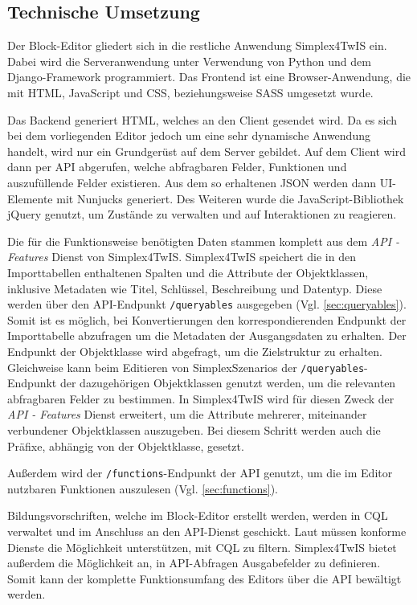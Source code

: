 \subsection{Technische Umsetzung}
Der Block-Editor gliedert sich in die restliche Anwendung Simplex4TwIS ein. Dabei wird die Serveranwendung unter Verwendung von Python und dem Django-Framework \parencite{djangosoftwarefoundationDjango} programmiert. Das Frontend ist eine Browser-Anwendung, die mit \ac{HTML}, JavaScript und \ac{CSS}, beziehungsweise \ac{SASS} umgesetzt wurde.

Das Backend generiert \ac{HTML}, welches an den Client gesendet wird. Da es sich bei dem vorliegenden Editor jedoch um eine sehr dynamische Anwendung handelt, wird nur ein Grundgerüst auf dem Server gebildet. Auf dem Client wird dann per \ac{API} abgerufen, welche abfragbaren Felder, Funktionen und auszufüllende Felder existieren. Aus dem so erhaltenen \ac{JSON} werden dann UI-Elemente mit Nunjucks \parencite{mozillaNunjucks} generiert. Des Weiteren wurde die JavaScript-Bibliothek jQuery \parencite{openjsfoundationJQuery} genutzt, um Zustände zu verwalten und auf Interaktionen zu reagieren.

Die für die Funktionsweise benötigten Daten stammen komplett aus dem \textit{API - Features} Dienst \parencite{ogcAPI} von Simplex4TwIS. Simplex4TwIS speichert die in den Importtabellen enthaltenen Spalten und die Attribute der Objektklassen, inklusive Metadaten wie Titel, Schlüssel, Beschreibung und Datentyp. Diese werden über den \ac{API}-Endpunkt \texttt{/queryables} ausgegeben (Vgl. \ref{sec:queryables}). Somit ist es möglich, bei Konvertierungen den korrespondierenden Endpunkt der Importtabelle abzufragen um die Metadaten der Ausgangsdaten zu erhalten. Der  Endpunkt der Objektklasse wird abgefragt, um die Zielstruktur zu erhalten. Gleichweise kann beim Editieren von SimplexSzenarios der \texttt{/queryables}-Endpunkt der dazugehörigen Objektklassen genutzt werden, um die relevanten abfragbaren Felder zu bestimmen. In Simplex4TwIS wird für diesen Zweck der \textit{API - Features} Dienst erweitert, um die Attribute mehrerer, miteinander verbundener Objektklassen auszugeben. Bei diesem Schritt werden auch die Präfixe, abhängig von der Objektklasse, gesetzt.

Außerdem wird der \texttt{/functions}-Endpunkt der \ac{API} genutzt, um die im Editor nutzbaren Funktionen auszulesen (Vgl. \ref{sec:functions}).

Bildungsvorschriften, welche im Block-Editor erstellt werden, werden in \ac{CQL} verwaltet und im Anschluss an den \ac{API}-Dienst geschickt. Laut  müssen konforme Dienste die Möglichkeit unterstützen, mit \ac{CQL} zu filtern. Simplex4TwIS bietet außerdem die Möglichkeit an, in \ac{API}-Abfragen Ausgabefelder zu definieren. Somit kann der komplette Funktionsumfang des Editors über die \ac{API} bewältigt werden.
